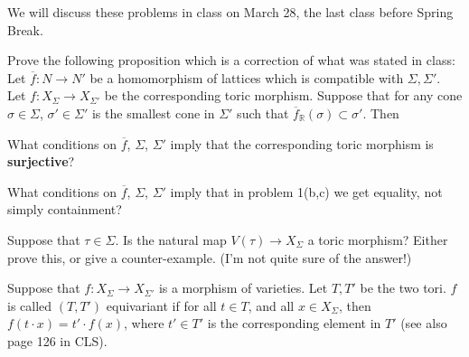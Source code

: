 \documentclass{exam}
\newcommand{\rr}{\mathbb{R}}
\begin{document}
We will discuss these problems in class on March 28, the last class
before Spring Break.

\begin{questions}

  \question Prove the following proposition which is a correction of what was stated in class:
  Let $\overline{f} : N \to N'$ be a homomorphism of lattices which is
  compatible with $\Sigma, \Sigma'$.  Let $f : X_\Sigma \to X_{\Sigma'}$ be the
  corresponding toric morphism.  Suppose that for any cone $\sigma \in \Sigma$,
  $\sigma' \in \Sigma'$ is the smallest cone in $\Sigma'$ such that $\overline{f}_\rr(\sigma) \subset \sigma'$.
  Then

  \question What conditions on $\overline{f}$, $\Sigma$, $\Sigma'$ imply that the corresponding
  toric morphism is {\bf surjective}?

  \question What conditions on $\overline{f}$, $\Sigma$, $\Sigma'$ imply that in problem 1(b,c) we get equality, not simply containment?

  \question Suppose that $\tau \in \Sigma$.  Is the natural map $V(\tau) \to X_\Sigma$ a toric morphism?  Either prove this, or
  give a counter-example.  (I'm not quite sure of the answer!)
  
  \question Suppose that $f : X_\Sigma \to X_{\Sigma'}$ is a morphism
  of varieties.  Let $T, T'$ be the two tori.
  $f$ is called $(T,T')$ equivariant if for all $t \in T$,
  and all $x \in X_\Sigma$, then $f(t \cdot x) = t' \cdot f(x)$, where
  $t' \in T'$ is the corresponding element in $T'$ (see also page 126 in CLS).
\end{questions}
\end{document}
